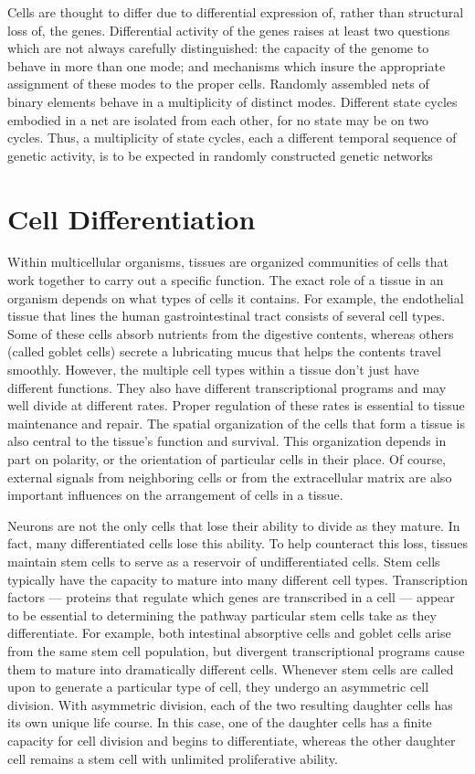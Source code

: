 Cells are thought to differ due to differential expression of, rather than
structural loss of, the genes. Differential activity of the genes raises at least
two questions which are not always carefully distinguished: the capacity of
the genome to behave in more than one mode; and mechanisms which insure
the appropriate assignment of these modes to the proper cells.
Randomly assembled nets of binary elements behave in a multiplicity
of distinct modes. Different state cycles embodied in a net are isolated from
each other, for no state may be on two cycles. Thus, a multiplicity
of state cycles, each a different temporal sequence of genetic activity, is to be expected in randomly constructed genetic networks

\section{Cell Differentiation}
Within multicellular organisms, tissues are organized communities of cells that work together to carry out a specific function. The exact role of a tissue in an organism depends on what types of cells it contains. For example, the endothelial tissue that lines the human gastrointestinal tract consists of several cell types. Some of these cells absorb nutrients from the digestive contents, whereas others (called goblet cells) secrete a lubricating mucus that helps the contents travel smoothly.
However, the multiple cell types within a tissue don't just have different functions. They also have different transcriptional programs and may well divide at different rates. Proper regulation of these rates is essential to tissue maintenance and repair. The spatial organization of the cells that form a tissue is also central to the tissue's function and survival. This organization depends in part on polarity, or the orientation of particular cells in their place. Of course, external signals from neighboring cells or from the extracellular matrix are also important influences on the arrangement of cells in a tissue.


Neurons are not the only cells that lose their ability to divide as they mature. In fact, many differentiated cells lose this ability. To help counteract this loss, tissues maintain stem cells to serve as a reservoir of undifferentiated cells. Stem cells typically have the capacity to mature into many different cell types. Transcription factors — proteins that regulate which genes are transcribed in a cell — appear to be essential to determining the pathway particular stem cells take as they differentiate. For example, both intestinal absorptive cells and goblet cells arise from the same stem cell population, but divergent transcriptional programs cause them to mature into dramatically different cells.
Whenever stem cells are called upon to generate a particular type of cell, they undergo an asymmetric cell division. With asymmetric division, each of the two resulting daughter cells has its own unique life course. In this case, one of the daughter cells has a finite capacity for cell division and begins to differentiate, whereas the other daughter cell remains a stem cell with unlimited proliferative ability.

